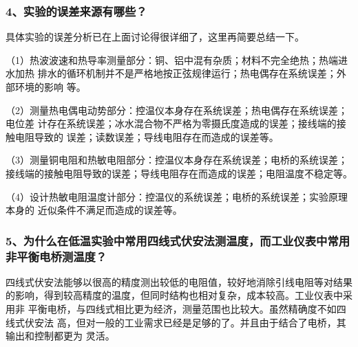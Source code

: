 \documentclass[11pt]{article}
\begin{document}
\subsubsection*{4、实验的误差来源有哪些？}
\begin{framed}
{\kaishu 
具体实验的误差分析已在上面讨论得很详细了，这里再简要总结一下。

（1）热波波速和热导率测量部分：铜、铝中混有杂质；材料不完全绝热；热端进水加热
排水的循环机制并不是严格地按正弦规律运行；热电偶存在系统误差；外部环境的影响
等。

（2）测量热电偶电动势部分：控温仪本身存在系统误差；热电偶存在系统误差；电位差
计存在系统误差；冰水混合物不严格为零摄氏度造成的误差；接线端的接触电阻导致的
误差；读数误差；导线电阻存在而造成的误差等。

（3）测量铜电阻和热敏电阻部分：控温仪本身存在系统误差；电桥的系统误差；接线端的接触电阻导致的误差；导线电阻存在而造成的误差；电阻温度不稳定等。

（4）设计热敏电阻温度计部分：控温仪的系统误差；电桥的系统误差；实验原理本身的
近似条件不满足而造成的误差等。
}
\end{framed}







\subsubsection*{5、为什么在低温实验中常用四线式伏安法测温度，而工业仪表中常用非平衡电桥测温度？}
\begin{framed}
{\kaishu 
四线式伏安法能够以很高的精度测出较低的电阻值，较好地消除引线电阻等对结果
的影响，得到较高精度的温度，但同时结构也相对复杂，成本较高。工业仪表中采用非
平衡电桥，与四线式相比更为经济，测量范围也比较大。虽然精确度不如四线式伏安法
高，但对一般的工业需求已经是足够的了。并且由于结合了电桥，其输出和控制都更为
灵活。
}
\end{framed}
\end{document}

